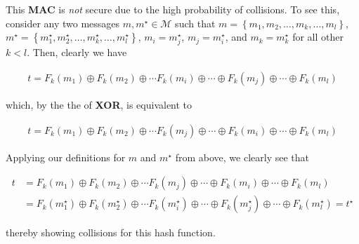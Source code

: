 \documentclass[../midterm.tex]{subfiles}
\begin{document}
\begin{flushleft}




  This \textbf{MAC} is \emph{not} secure due to the high probability of collisions.  To see this, consider any two messages $m, m^\star \in \mathcal{M}$ such that $m = \left\{ m_1, m_2, \dots, m_k, \dots, m_l \right\}$, $m^\star = \left\{ m_1^\star, m_2^\star, \dots, m_k^\star, \dots, m_l^\star \right\}$, $m_i = m^\star_j$, $m_j = m^\star_i$, and $m_k = m^\star_k$ for all other $k < l$.  Then, clearly we have

\begin{align*}
t = F_k \left( m_1 \right) \oplus F_k \left( m_2 \right) \oplus \cdots F_k \left( m_i \right) \oplus \cdots \oplus F_k \left( m_j \right) \oplus \cdots \oplus F_k \left( m_l \right)
\end{align*}

which, by the the of \textbf{XOR}, is equivalent to 

\begin{align*}
t = F_k \left( m_1 \right) \oplus F_k \left( m_2 \right) \oplus \cdots F_k \left( m_j \right) \oplus \cdots \oplus F_k \left( m_i \right) \oplus \cdots \oplus F_k \left( m_l \right)
\end{align*}

Applying our definitions for $m$ and $m^\star$ from above, we clearly see that

\begin{align*}
t &= F_k \left( m_1 \right) \oplus F_k \left( m_2 \right) \oplus \cdots F_k \left( m_j \right) \oplus \cdots \oplus F_k \left( m_i \right) \oplus \cdots \oplus F_k \left( m_l \right) \\
&= F_k \left( m^\star_1 \right) \oplus F_k \left( m^\star_2 \right) \oplus \cdots F_k \left( m^\star_i \right) \oplus \cdots \oplus F_k \left( m^\star_j \right) \oplus \cdots \oplus F_k \left( m^\star_l \right) = t^\star
\end{align*}

thereby showing collisions for this hash function. \newline




\end{flushleft}
\end{document}
